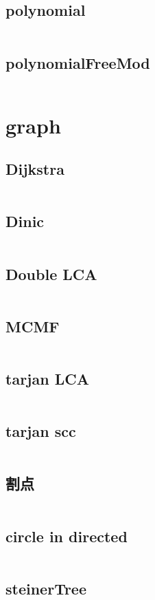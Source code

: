 \subsection{polynomial}
  \inputminted{cpp}{../code/math/polynomial.cpp}
\subsection{polynomialFreeMod}
  \inputminted{cpp}{../code/math/polynomialFreeMod.cpp}
\section{graph}
\subsection{Dijkstra}
  \inputminted{cpp}{../code/graph/Dijkstra.cpp}
\subsection{Dinic}
  \inputminted{cpp}{../code/graph/Dinic.cpp}
\subsection{Double LCA}
  \inputminted{cpp}{../code/graph/Double_LCA.cpp}
\subsection{MCMF}
  \inputminted{cpp}{../code/graph/MCMF.cpp}
\subsection{tarjan LCA}
  \inputminted{cpp}{../code/graph/tarjan_LCA.cpp}
\subsection{tarjan scc}
  \inputminted{cpp}{../code/graph/tarjan_scc.cpp}
\subsection{割点}
  \inputminted{cpp}{../code/graph/割点.cpp}
\subsection{circle in directed}
  \inputminted{cpp}{../code/graph/circle_in_directed.cpp}
\subsection{steinerTree}
  \inputminted{cpp}{../code/graph/steinerTree.cpp}
